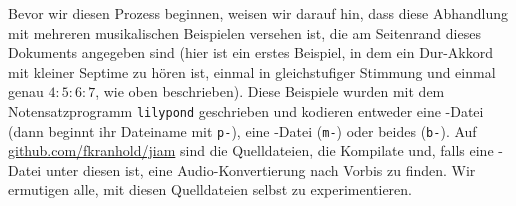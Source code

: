 
\noindent Bevor wir diesen Prozess beginnen, weisen wir darauf hin, dass diese
Abhandlung mit mehreren musikalischen Beispielen versehen ist, die am Seitenrand
dieses Dokuments angegeben sind (hier ist ein erstes Beispiel, in dem
ein Dur-Akkord mit kleiner Septime zu hören ist, einmal in gleichstufiger
Stimmung und einmal genau \mbox{$4:5:6:7$}, wie oben beschrieben). Diese
Beispiele wurden mit dem Notensatzprogramm \verb!lilypond! geschrieben und
kodieren entweder eine -Datei (dann beginnt ihr Dateiname mit
\verb!p-!), eine -Datei (\verb!m-!) oder beides (\verb!b-!). Auf
\href{https://github.com/fkranhold/jiam/}{\textsf{github.com/fkranhold/jiam}}
sind die Quelldateien, die Kompilate und, falls eine -Datei unter
diesen ist, eine Audio-Konvertierung nach  Vorbis zu finden. Wir
ermutigen alle, mit diesen Quelldateien selbst zu experimentieren.

